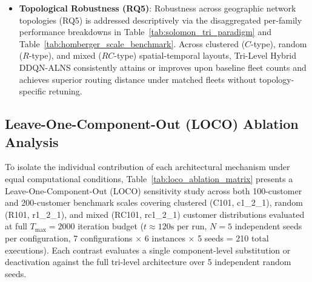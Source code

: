 \documentclass{ieeeaccess}
\begin{document}
\begin{itemize}
    \item \textbf{Topological Robustness (RQ5)}: Robustness across geographic network topologies (RQ5) is addressed descriptively via the disaggregated per-family performance breakdowns in Table~\ref{tab:solomon_tri_paradigm} and Table~\ref{tab:homberger_scale_benchmark}. Across clustered ($C$-type), random ($R$-type), and mixed ($RC$-type) spatial-temporal layouts, Tri-Level Hybrid DDQN-ALNS consistently attains or improves upon baseline fleet counts and achieves superior routing distance under matched fleets without topology-specific retuning.
\end{itemize}

\subsection{Leave-One-Component-Out (LOCO) Ablation Analysis}
\label{sec:ablation_results}

To isolate the individual contribution of each architectural mechanism under equal computational conditions, Table~\ref{tab:loco_ablation_matrix} presents a Leave-One-Component-Out (LOCO) sensitivity study across both 100-customer and 200-customer benchmark scales covering clustered (C101, c1\_2\_1), random (R101, r1\_2\_1), and mixed (RC101, rc1\_2\_1) customer distributions evaluated at full $T_{\max}=2000$ iteration budget ($t \approx 120\text{s}$ per run, $N=5$ independent seeds per configuration, 7 configurations $\times$ 6 instances $\times$ 5 seeds = 210 total executions). Each contrast evaluates a single component-level substitution or deactivation against the full tri-level architecture over 5 independent random seeds.
\end{document}
